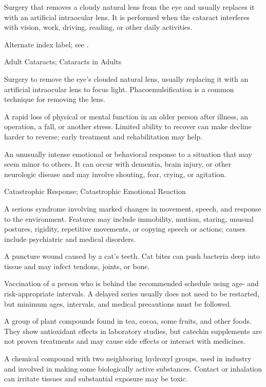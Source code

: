  Surgery that removes a cloudy natural lens from the eye and usually replaces it with an artificial intraocular lens. It is performed when the cataract interferes with vision, work, driving, reading, or other daily activities.

 Alternate index label; see .

\synonyms
Adult Cataracts; Cataracts in Adults

 Surgery to remove the eye's clouded natural lens, usually replacing it with an artificial intraocular lens to focus light. Phacoemulsification is a common technique for removing the lens.

 A rapid loss of physical or mental function in an older person after illness, an operation, a fall, or another stress. Limited ability to recover can make decline harder to reverse; early treatment and rehabilitation may help.

 An unusually intense emotional or behavioral response to a situation that may seem minor to others. It can occur with dementia, brain injury, or other neurologic disease and may involve shouting, fear, crying, or agitation.

\synonyms
Catastrophic Response; Catastrophic Emotional Reaction

 A serious syndrome involving marked changes in movement, speech, and response to the environment. Features may include immobility, mutism, staring, unusual postures, rigidity, repetitive movements, or copying speech or actions; causes include psychiatric and medical disorders.

 A puncture wound caused by a cat's teeth. Cat bites can push bacteria deep into tissue and may infect tendons, joints, or bone.

 Vaccination of a person who is behind the recommended schedule using age- and risk-appropriate intervals. A delayed series usually does not need to be restarted, but minimum ages, intervals, and medical precautions must be followed.

 A group of plant compounds found in tea, cocoa, some fruits, and other foods. They show antioxidant effects in laboratory studies, but catechin supplements are not proven treatments and may cause side effects or interact with medicines.

 A chemical compound with two neighboring hydroxyl groups, used in industry and involved in making some biologically active substances. Contact or inhalation can irritate tissues and substantial exposure may be toxic.

